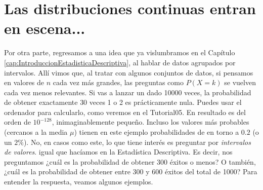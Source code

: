 \section{Las distribuciones continuas entran en escena...} \label{sec:distribucionesContinuasEntranEscena}

Por otra parte, regresamos a una idea que ya vislumbramos en el Capítulo \ref{cap:IntroduccionEstadisticaDescriptiva}, al hablar de datos agrupados por intervalos. Allí vimos que, al tratar con algunos conjuntos de datos,  si pensamos en valores de $n$ cada vez más grandes, las preguntas como $P(X=k)$ se vuelven cada vez menos relevantes. Si vas a lanzar un dado 10000 veces, la probabilidad de obtener exactamente $30$ veces 1 o 2 es prácticamente nula. Puedes usar el ordenador para calcularlo, como veremos en el Tutorial05. En resultado es del orden de $10^{-128}$, inimaginablemente pequeño. Incluso los valores más probables (cercanos a la media $\mu$) tienen en este ejemplo  probabilidades de en torno a $0.2$ (o un $2\%$).  No, en casos como este, lo que tiene interés es preguntar por {\em intervalos de valores}. igual que hacíamos en la Estadística Descriptiva. Es decir, nos preguntamos ¿cuál es la probabilidad de obtener 300 éxitos o menos? O también, ¿cuál es la probabilidad de obtener entre 300 y 600 éxitos del total de 1000? Para entender la respuesta, veamos algunos ejemplos.

